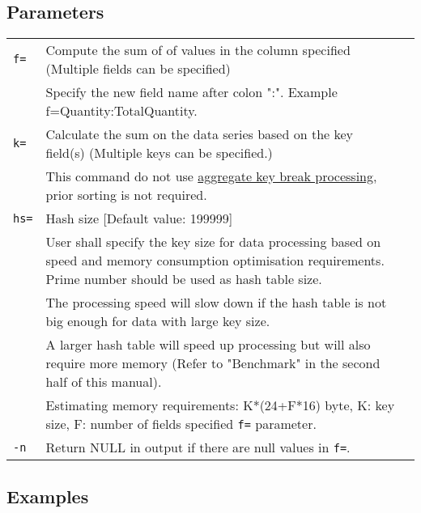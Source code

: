 \subsection*{Parameters}
\begin{table}[htbp]
{\small
\begin{tabular}{l p{15cm} l}
\verb|f=|    & Compute the sum of of values in the column specified (Multiple fields can be specified) \\
             & Specify the new field name after colon ":". Example f=Quantity:TotalQuantity. \\
\verb|k=|   & Calculate the sum on the data series based on the key field(s)  (Multiple keys can be specified.)\\
 	& This command do not use \hyperref[sect:option_k]{aggregate key break processing}, prior sorting is not required.\\
\verb|hs=|   & Hash size [Default value: 199999] \\
             & User shall specify the key size for data processing based on speed and memory consumption optimisation requirements.  Prime number should be used as hash table size. \\
             & The processing speed will slow down if the hash table is not big enough for data with large key size.  \\
             & A larger hash table will speed up processing but will also require more memory (Refer to "Benchmark" in the second half of this manual). \\
             &  Estimating memory requirements: K*(24+F*16) byte, K: key size, F: number of fields specified \verb|f=| parameter. \\
\verb|-n|    & Return NULL in output if there are null values in \verb|f=|. \\
\end{tabular} 
}
\end{table} 

\subsection*{Examples}


